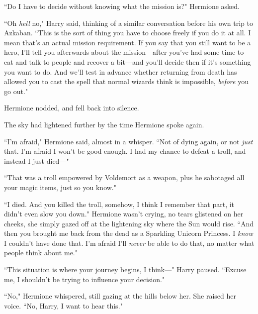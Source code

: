 ``Do I have to decide without knowing what the mission is?" Hermione asked.

``Oh \emph{hell} no," Harry said, thinking of a similar conversation before his own trip to Azkaban. ``This is the sort of thing you have to choose freely if you do it at all. I mean that's an actual mission requirement. If you say that you still want to be a hero, I'll tell you afterwards about the mission---after you've had some time to eat and talk to people and recover a bit---and you'll decide then if it's something you want to do. And we'll test in advance whether returning from death has allowed you to cast the spell that normal wizards think is impossible, \emph{before} you go out."

Hermione nodded, and fell back into silence.

The sky had lightened further by the time Hermione spoke again.

``I'm afraid," Hermione said, almost in a whisper. ``Not of dying again, or not \emph{just} that. I'm afraid I won't be good enough. I had my chance to defeat a troll, and instead I just died---"

``That was a troll empowered by Voldemort as a weapon, plus he sabotaged all your magic items, just so you know."

``I died. And you killed the troll, somehow, I think I remember that part, it didn't even slow you down." Hermione wasn't crying, no tears glistened on her cheeks, she simply gazed off at the lightening sky where the Sun would rise. ``And then you brought me back from the dead as a Sparkling Unicorn Princess. I \emph{know} I couldn't have done that. I'm afraid I'll \emph{never} be able to do that, no matter what people think about me."

``This situation is where your journey begins, I think---" Harry paused. ``Excuse me, I shouldn't be trying to influence your decision."

``No," Hermione whispered, still gazing at the hills below her. She raised her voice. ``No, Harry, I want to hear this."

